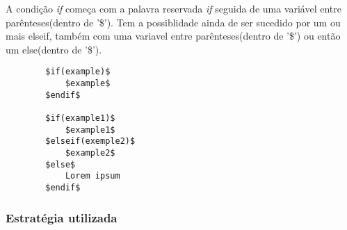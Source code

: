 \documentclass[../relatorio.tex]{subfiles}
\begin{document}
    A condição \textit{if} começa com a palavra reservada \textit{if}
    seguida de uma variável entre parênteses(dentro de '\$'). Tem a
    possiblidade ainda de ser sucedido por um ou mais elseif, também com 
    uma variavel entre parênteses(dentro de '\$') ou então um else(dentro de '\$'). 

    \begin{verbatim}
        $if(example)$
            $example$
        $endif$

        $if(example1)$
            $example1$
        $elseif(exemple2)$
            $example2$
        $else$
            Lorem ipsum    
        $endif$
    \end{verbatim}

    \subsubsection{Estratégia utilizada}

    
\end{document}
